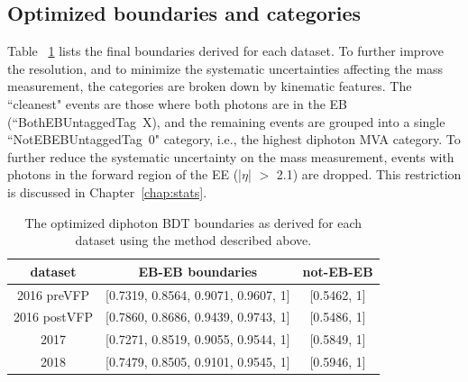 \subsection{Optimized boundaries and categories}

Table ~\ref{tab:boundaries} lists the final boundaries derived for each dataset. To further improve the resolution, and to minimize the systematic uncertainties affecting the mass measurement, the categories are broken down by kinematic features. The ``cleanest" events are those where both photons are in the EB (``BothEBUntaggedTag\textunderscore~X), and the remaining events are grouped into a single ``NotEBEBUntaggedTag\textunderscore~0" category, i.e., the highest diphoton MVA category. To further reduce the systematic uncertainty on the mass measurement, events with photons in the forward region of the EE (|$\eta$| $ > $ 2.1) are dropped. This restriction is discussed in Chapter~\ref{chap:stats}.

\begin{table}[htbp]
    \centering
    \begin{tabular}{ c  c  c}
        dataset & EB-EB boundaries &  not-EB-EB \\ \hline \hline
        2016 preVFP  & [0.7319, 0.8564, 0.9071, 0.9607, 1] & [0.5462, 1] \\ \hline
        2016 postVFP & [0.7860, 0.8686, 0.9439, 0.9743, 1] & [0.5486, 1] \\ \hline
        2017         & [0.7271, 0.8519, 0.9055, 0.9544, 1] & [0.5849, 1] \\ \hline
        2018         & [0.7479, 0.8505, 0.9101, 0.9545, 1] & [0.5946, 1] \\ \hline 
    \end{tabular}
    \caption[Optimized diphoton BDT boundaries.]{The optimized diphoton BDT boundaries as derived for each dataset using the method described above.}
    \label{tab:boundaries}
\end{table}